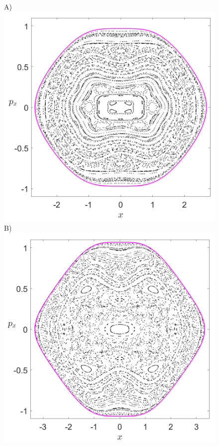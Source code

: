\documentclass[10pt,aps,onecolumn,superscriptaddress]{revtex4-2}
\begin{document}
\begin{figure}[htbp]
	A)\includegraphics[scale=0.3]{PS_cirque_H_-0_2_y_0_w0_1div2_d_1_k_sqrt7.png}
	B)\includegraphics[scale=0.3]{PS_cirque_H_-0_1_y_0_w0_1div2_d_1_k_sqrt7.png}	

\end{figure}
\end{document}
